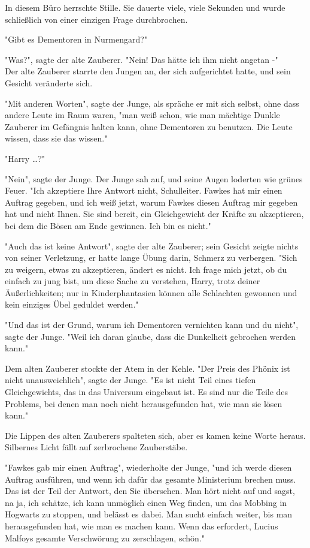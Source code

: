 {In diesem Büro herrschte Stille. Sie dauerte viele, viele Sekunden und wurde schließlich von einer einzigen Frage durchbrochen.

"Gibt es Dementoren in Nurmengard?"

"Was?", sagte der alte Zauberer. "Nein! Das hätte ich ihm nicht angetan -"\\ Der alte Zauberer starrte den Jungen an, der sich aufgerichtet hatte, und sein Gesicht veränderte sich.

"Mit anderen Worten", sagte der Junge, als spräche er mit sich selbst, ohne dass andere Leute im Raum waren, "man weiß schon, wie man mächtige Dunkle Zauberer im Gefängnis halten kann, ohne Dementoren zu benutzen. Die Leute wissen, dass sie das wissen."

"Harry …?"

"Nein", sagte der Junge. Der Junge sah auf, und seine Augen loderten wie grünes Feuer. "Ich akzeptiere Ihre Antwort nicht, Schulleiter. Fawkes hat mir einen Auftrag gegeben, und ich weiß jetzt, warum Fawkes diesen Auftrag mir gegeben hat und nicht Ihnen. Sie sind bereit, ein Gleichgewicht der Kräfte zu akzeptieren, bei dem die Bösen am Ende gewinnen. Ich bin es nicht."

"Auch das ist keine Antwort", sagte der alte Zauberer; sein Gesicht zeigte nichts von seiner Verletzung, er hatte lange Übung darin, Schmerz zu verbergen. "Sich zu weigern, etwas zu akzeptieren, ändert es nicht. Ich frage mich jetzt, ob du einfach zu jung bist, um diese Sache zu verstehen, Harry, trotz deiner Äußerlichkeiten; nur in Kinderphantasien können alle Schlachten gewonnen und kein einziges Übel geduldet werden."

"Und das ist der Grund, warum ich Dementoren vernichten kann und du nicht", sagte der Junge. "Weil ich daran glaube, dass die Dunkelheit gebrochen werden kann."

Dem alten Zauberer stockte der Atem in der Kehle. "Der Preis des Phönix ist nicht unausweichlich", sagte der Junge. "Es ist nicht Teil eines tiefen Gleichgewichts, das in das Universum eingebaut ist. Es sind nur die Teile des Problems, bei denen man noch nicht herausgefunden hat, wie man sie lösen kann."

Die Lippen des alten Zauberers spalteten sich, aber es kamen keine Worte heraus. Silbernes Licht fällt auf zerbrochene Zauberstäbe.

"Fawkes gab mir einen Auftrag", wiederholte der Junge, "und ich werde diesen Auftrag ausführen, und wenn ich dafür das gesamte Ministerium brechen muss. Das ist der Teil der Antwort, den Sie übersehen. Man hört nicht auf und sagst, na ja, ich schätze, ich kann unmöglich einen Weg finden, um das Mobbing in Hogwarts zu stoppen, und belässt es dabei. Man sucht einfach weiter, bis man herausgefunden hat, wie man es machen kann. Wenn das erfordert, Lucius Malfoys gesamte Verschwörung zu zerschlagen, schön."

}
